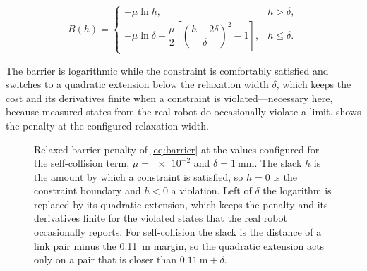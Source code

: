 \begin{equation}
  B(h) =
  \begin{cases}
    -\mu \ln h, & h > \delta, \\[2pt]
    -\mu \ln \delta
      + \dfrac{\mu}{2}\left[ \left(\dfrac{h - 2\delta}{\delta}\right)^{2} - 1 \right],
      & h \le \delta .
  \end{cases}
  \label{eq:barrier}
\end{equation}

The barrier is logarithmic while the constraint is comfortably
satisfied and switches to a quadratic extension below the relaxation
width $\delta$, which keeps the cost and its derivatives finite when a
constraint is violated---necessary here, because measured states from
the real robot do occasionally violate a limit. 
shows the penalty at the configured relaxation width.

\begin{figure}[htbp]
  \centering
  \caption[Relaxed barrier penalty at the configured relaxation width]{%
    Relaxed barrier penalty of \cref{eq:barrier} at the values configured
    for the self-collision term, $\mu = \num{e-2}$ and
    $\delta = \qty{1}{\milli\meter}$. The slack $h$ is the amount by
    which a constraint is satisfied, so $h = 0$ is the constraint
    boundary and $h < 0$ a violation. Left of $\delta$ the logarithm is
    replaced by its quadratic extension, which keeps the penalty and its
    derivatives finite for the violated states that the real robot
    occasionally reports. For self-collision the slack is the distance of
    a link pair minus the \qty{0.11}{\meter} margin, so the quadratic
    extension acts only on a pair that is closer than
    $\qty{0.11}{\meter} + \delta$.}
  \label{fig:barrier}
\end{figure}

